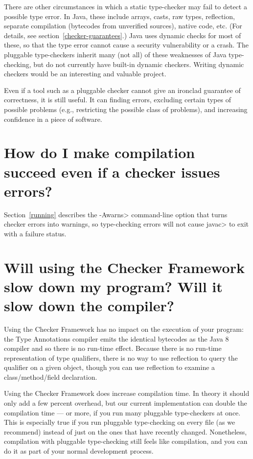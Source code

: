 There are other circumstances in which a static type-checker may fail to
detect a possible type error.  In Java, these include arrays, casts, raw
types, reflection, separate compilation (bytecodes from unverified sources),
native code, etc.  (For details, see section~\ref{checker-guarantees}.)
Java uses dynamic checks for most of these, so that the
type error cannot cause a security vulnerability or a crash.  The pluggable
type-checkers inherit many (not all) of these weaknesses of Java
type-checking, but do not currently have built-in dynamic checkers.
Writing dynamic checkers would be an interesting and valuable project.


Even if a tool such as a pluggable checker cannot give an ironclad
guarantee of correctness, it is still useful.  It can finding errors, 
excluding certain types of possible problems (e.g., restricting the
possible class of problems), and increasing confidence in a piece of
software.


\section{How do I make compilation succeed even if a checker issues errors?\label{faq-awarns}}

Section~\ref{running} describes the \<-Awarns> command-line
option that turns checker errors into warnings, so type-checking errors
will not cause \<javac> to exit with a failure status.


\section{Will using the Checker Framework slow down my program?  Will it slow down the compiler?\label{faq-slowdown}}

Using the Checker Framework has no impact on the execution of your program:
the Type Annotations compiler emits the identical bytecodes as the Java 8
compiler and so there is no run-time effect.  Because there is no run-time
representation of type qualifiers, there is no way to use reflection to
query the qualifier on a given object, though you can use reflection to
examine a class/method/field declaration.

Using the Checker Framework does increase compilation time.  In theory it
should only add a few percent overhead, but our current implementation
can double the compilation time --- or more, if you run many pluggable
type-checkers at once.  This is especially true if you run pluggable
type-checking on every file (as we recommend) instead of just on the ones
that have recently changed.
Nonetheless, compilation with pluggable type-checking still feels like
compilation, and you can do it as part of your normal development process.



